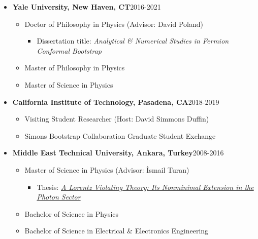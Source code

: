 \documentclass[letterpaper,11pt]{article}
\begin{document}
\begin{itemize}[noitemsep,nolistsep] 
	\item[] \textbf{Yale University, New Haven, CT}\hfill 2016-2021
	\vspace*{-.5em}
	\begin{itemize}
		\item[] Doctor of Philosophy in Physics \hfill (Advisor: David Poland)\hspace*{2.2em}\vspace*{-.5em}
		\begin{itemize}
			\item[] Dissertation title: \emph{Analytical \& Numerical Studies in Fermion Conformal Bootstrap}\vspace*{-.5em}
		\end{itemize}
		\item[] Master of Philosophy in Physics\vspace*{-.5em}
		\item[]Master of Science in Physics
	\end{itemize} 
	\item[] \textbf{California Institute of Technology, Pasadena, CA}\hfill 2018-2019
	\vspace*{-.5em}
\begin{itemize}
	\item[] Visiting Student Researcher \hfill (Host: David Simmons Duffin)\hspace*{2.2em}\vspace*{-.5em}
	\item[] Simons Bootstrap Collaboration Graduate Student Exchange
\end{itemize} 
	\item[] \textbf{Middle East Technical University, Ankara, Turkey}\hfill 2008-2016
\vspace*{-.5em}
\begin{itemize}
	\item[] Master of Science in Physics \hfill (Advisor: İsmail Turan)\hspace*{2.2em}\vspace*{-.5em}
	\begin{itemize}
		\item[] Thesis: \hyperref{https://arxiv.org/abs/1602.07676}{}{}{\emph{A Lorentz Violating Theory: Its Nonminimal Extension in the Photon Sector}}\vspace*{-.5em}
	\end{itemize}
	\item[] Bachelor of Science in Physics\vspace*{-.5em}
	\item[] Bachelor of Science in Electrical \& Electronics Engineering
\end{itemize} 
\end{itemize}
\end{document}
